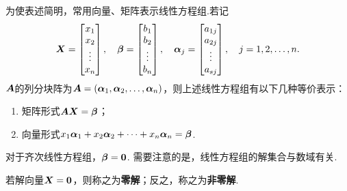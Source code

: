 \begin{definition}
为使表述简明，常用向量、矩阵表示线性方程组.若记\[
\boldsymbol{X}=\begin{bmatrix}
x_1 \\ x_2 \\ \vdots \\ x_n
\end{bmatrix},
\quad
\boldsymbol{\beta}=\begin{bmatrix}
b_1 \\ b_2 \\ \vdots \\ b_n
\end{bmatrix},
\quad
\boldsymbol{\alpha}_j=\begin{bmatrix}
a_{1j} \\ a_{2j} \\ \vdots \\ a_{sj}
\end{bmatrix},
\quad j=1,2,\dotsc,n.
\]
\(\boldsymbol{A}\)的列分块阵为\(\boldsymbol{A} = (\boldsymbol{\alpha}_1,\boldsymbol{\alpha}_2,\dotsc,\boldsymbol{\alpha}_n)\)，则上述线性方程组有以下几种等价表示：
\begin{enumerate}
\item 矩阵形式\(\boldsymbol{A} \boldsymbol{X} = \boldsymbol{\beta}\)；
\item 向量形式\(x_1 \boldsymbol{\alpha}_1 + x_2 \boldsymbol{\alpha}_2 + \dotsb + x_n \boldsymbol{\alpha}_n = \boldsymbol{\beta}\).
\end{enumerate}
对于齐次线性方程组，\(\boldsymbol{\beta}=\boldsymbol{0}\).
需要注意的是，线性方程组的解集合与数域有关.

若解向量\(\boldsymbol{X}=\boldsymbol{0}\)，则称之为\textbf{零解}；反之，称之为\textbf{非零解}.
\end{definition}

